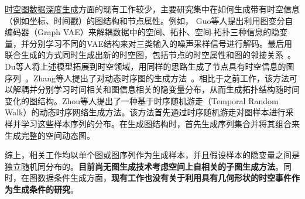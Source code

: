 \underline{时空图数据深度生成}方面的现有工作较少，主要研究集中在如何生成带有时空信息（例如坐标、时间戳）的图结构和节点属性。例如，
Guo等人提出利用图变分自编码器（Graph VAE）来解耦数据中的空间、拓扑、空间-拓扑三种信息的隐变量，并分别学习不同的VAE结构来对三类输入的噪声采样信号进行解码。最后用联合生成的方式同时生成出新的时空图，包括节点的时空属性和图的邻接关系~\cite{du2022disentangled}。Du等人将上述模型拓展到时空领域，用同样的思路生成了节点具有时空信息的图序列~\cite{du2022disentangled}。Zhang等人提出了对动态时序图的生成方法~\cite{zhang2021disentangled}。相比于之前工作，该方法可以解耦并分别学习时间相关和图信息相关的隐变量分布，从而生成拓扑结构随时间变化的图结构。Zhou等人提出了一种基于时序随机游走（Temporal Random Walk）的动态时序网络生成方法。该方法首先通过时序随机游走对图样本进行采样并学习这些样本序列的分布。在生成图结构时，首先生成序列集合并将其组合来生成完整的空间动态图。

综上，相关工作均以单个图或图序列作为生成样本，并且假设样本的隐变量之间是独立随机同分布的。\textbf{目前尚无图生成技术考虑空间上自相关的子图生成方法}。同时，在图数据条件生成方面，\textbf{现有工作也没有关于利用具有几何形状的时空事件作为生成条件的研究}。

\iffalse
\subsubsection{1.2.3 图嵌入和子图采样技术}
子图采样方法主要目的是帮助提高图神经网络的训练效率。在大规模图数据上，用全图数据进行训练在计算上不可行。如何提高训练效率并尽可能地将有代表性的信息纳入训练集，是子图采样策略研究的核心问题。现有的采样方法的对象是图嵌入和表示学习。例如，通过随机行走(random walk)的方法对结点的关联边进行采样，以涵盖邻居节点的信息。然而，这些图采样方法都不是以子图数据生成为目标。子图数据生成需要决定将哪些子图划分为生成训练的样本。同时，这些子图也将在生成阶段作为生成单元。其核心目标是划分出数据分布相似，学习难度较低的子图。\fi




